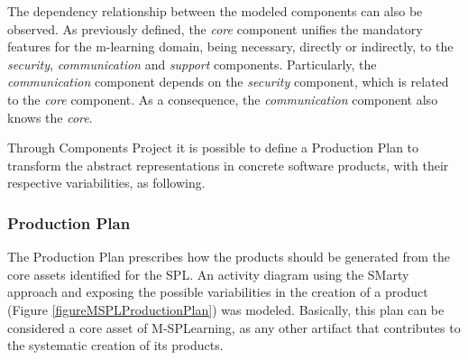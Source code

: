 The dependency relationship between the modeled components can also be observed. As previously defined, the \textit{core} component unifies the mandatory features for the m-learning domain, being necessary, directly or indirectly, to the \textit{security}, \textit{communication} and \textit{support} components. Particularly, the \textit{communication} component depends on the \textit{security} component, which is related to the \textit{core} component. As a consequence, the \textit{communication} component also knows the \textit{core}.

Through Components Project it is possible to define a Production Plan to transform the abstract representations in concrete software products, with their respective variabilities, as following.

\subsubsection{Production Plan}

The Production Plan prescribes how the products should be generated from the core assets identified for the SPL. An activity diagram using the SMarty approach and exposing the possible variabilities in the creation of a product (Figure \ref{figureMSPLProductionPlan}) was modeled. Basically, this plan can be considered a core asset of M-SPLearning, as any other artifact that contributes to the systematic creation of its products.

